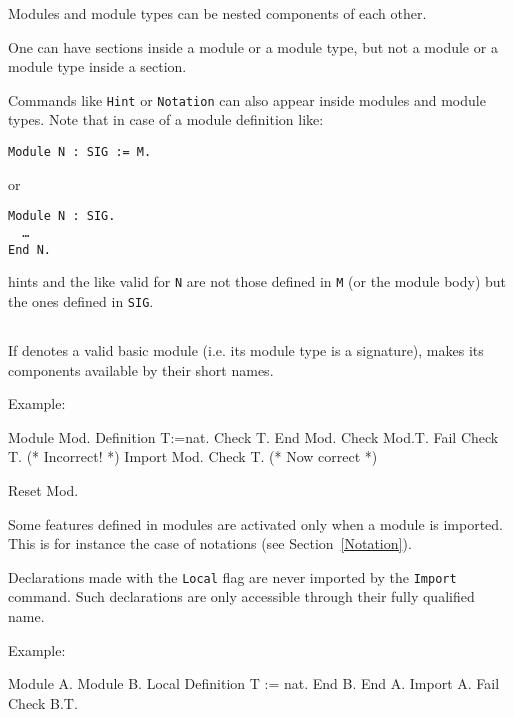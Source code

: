\begin{Remarks}
\item Modules and module types can be nested components of each other.
\item One can have sections inside a module or a module type, but
  not a module or a module type inside a section.
\item Commands like \texttt{Hint} or \texttt{Notation} can
  also appear inside modules and module types. Note that in case of a
  module definition like:

    \smallskip
    \noindent
    {\tt Module N : SIG := M.} 
    \smallskip

    or

    \smallskip
    {\tt Module N : SIG.\\
      \ \ \dots\\
      End N.}
    \smallskip 
    
    hints and the like valid for \texttt{N} are not those defined in
    \texttt{M} (or the module body) but the ones defined in
    \texttt{SIG}.

\end{Remarks}

\subsection{}

If {\qualid} denotes a valid basic module (i.e. its module type is a
signature), makes its components available by their short names.

Example:

\begin{coq_example}
Module Mod.
  Definition T:=nat.
  Check T.
End Mod.
Check Mod.T.
Fail Check T. (* Incorrect! *)
Import Mod.
Check T. (* Now correct *)
\end{coq_example}
\begin{coq_eval}
Reset Mod.
\end{coq_eval}

Some features defined in modules are activated only when a module is
imported. This is for instance the case of notations (see
Section~\ref{Notation}).

Declarations made with the {\tt Local} flag are never imported by the
{\tt Import} command. Such declarations are only accessible through their
fully qualified name.

Example:

\begin{coq_example}
Module A.
Module B.
Local Definition T := nat.
End B.
End A.
Import A.
Fail Check B.T.
\end{coq_example}

